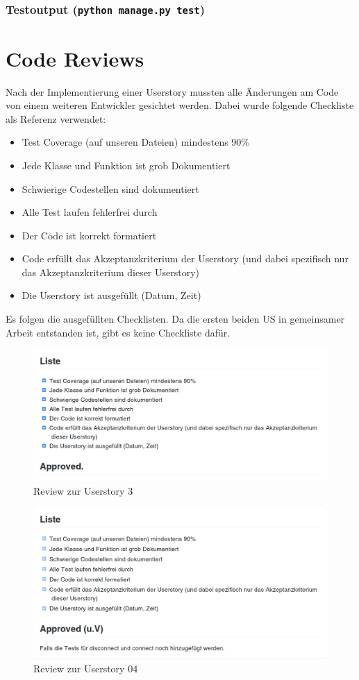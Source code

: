 \documentclass[accentcolor=tud9c,12pt,paper=a4]{tudreport}
\begin{document}
	\subsubsection{Testoutput (\texttt{python manage.py test})}
	


	\newpage
	\section{Code Reviews}
	Nach der Implementierung einer Userstory mussten alle Änderungen am Code von einem weiteren Entwickler
	gesichtet werden. Dabei wurde folgende Checkliste als Referenz verwendet:
	\begin{itemize}
		\item Test Coverage (auf unseren Dateien) mindestens 90\%
		\item Jede Klasse und Funktion ist grob Dokumentiert
		\item Schwierige Codestellen sind dokumentiert
		\item Alle Test laufen fehlerfrei durch
		\item Der Code ist korrekt formatiert
		\item Code erfüllt das Akzeptanzkriterium der Userstory (und dabei spezifisch nur das Akzeptanzkriterium dieser Userstory)
		\item Die Userstory ist ausgefüllt (Datum, Zeit)
	\end{itemize}
	Es folgen die ausgefüllten Checklisten. Da die ersten beiden US in gemeinsamer Arbeit entstanden ist, gibt es keine Checkliste dafür.
	\begin{figure}[H]
	\centering
	\includegraphics[width=.8\textwidth]{code_review/us03}
		\caption{Review zur Userstory 3}
	\end{figure}

\begin{figure}[H]
\centering
\includegraphics[width=.8\textwidth]{code_review/us04}
\caption{Review zur Userstory 04}
\end{figure}
\end{document}
